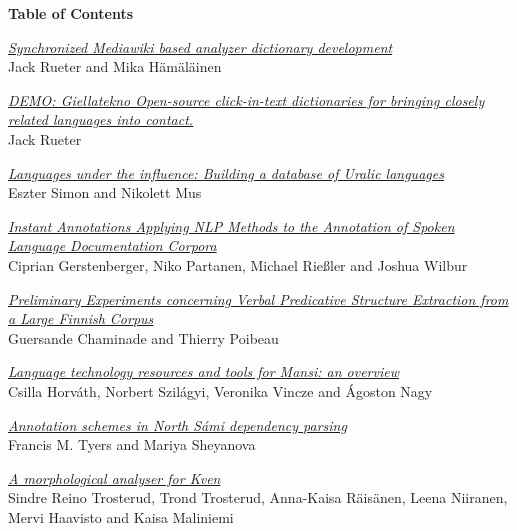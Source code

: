 \setlength{\parindent}{0in}
\setlength{\parskip}{2ex}

\begin{center}
  {\Large \bf Table of Contents}
\end{center}

\vspace*{0.5cm}



\hyperlink{page.1}{\em Synchronized Mediawiki based analyzer dictionary development}\samepage \\
\hspace*{7mm} Jack Rueter and Mika H\"{a}m\"{a}l\"{a}inen\dotfill {}

\hyperlink{page.8}{\em DEMO: Giellatekno Open-source click-in-text dictionaries for bringing closely related languages into contact.}\samepage \\
\hspace*{7mm} Jack Rueter\dotfill {}

\hyperlink{page.10}{\em Languages under the influence: Building a database of Uralic languages}\samepage \\
\hspace*{7mm} Eszter Simon and Nikolett Mus\dotfill {}

\hyperlink{page.25}{\em Instant Annotations \textendash Applying NLP Methods to the Annotation of Spoken Language Documentation Corpora}\samepage \\
\hspace*{7mm} Ciprian Gerstenberger, Niko Partanen, Michael Rie\ss ler and Joshua Wilbur\dotfill {}

\hyperlink{page.37}{\em Preliminary Experiments concerning Verbal Predicative Structure Extraction from a Large Finnish Corpus}\samepage \\
\hspace*{7mm} Guersande Chaminade and Thierry Poibeau\dotfill {}

\hyperlink{page.56}{\em Language technology resources and tools for Mansi: an overview}\samepage \\
\hspace*{7mm} Csilla Horv\'{a}th, Norbert Szil\'{a}gyi, Veronika Vincze and \'{A}goston Nagy\dotfill {}

\hyperlink{page.66}{\em Annotation schemes in North S\'{a}mi dependency parsing}\samepage \\
\hspace*{7mm} Francis M. Tyers and Mariya Sheyanova\dotfill {}

\hyperlink{page.76}{\em A morphological analyser for Kven}\samepage \\
\hspace*{7mm} Sindre Reino Trosterud, Trond Trosterud, Anna-Kaisa R\"{a}is\"{a}nen, Leena Niiranen, Mervi Haavisto and Kaisa Maliniemi\dotfill {}


